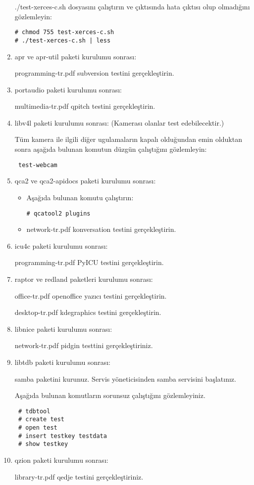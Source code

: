 \documentclass[a4paper,10pt]{article}
\begin{document}
\begin{enumerate}
./test-xerces-c.sh dosyasını çalıştırın ve çıktısında hata çıktısı olup olmadığını gözlemleyin:
\begin{verbatim}
# chmod 755 test-xerces-c.sh
# ./test-xerces-c.sh | less
\end{verbatim}

\item apr ve apr-util paketi kurulumu sonrası:

programming-tr.pdf subversion testini gerçekleştirin.

\item portaudio paketi kurulumu sonrası:

multimedia-tr.pdf qpitch testini gerçekleştirin.

\item libv4l paketi kurulumu sonrası: (Kamerası olanlar test edebilecektir.)

Tüm kamera ile ilgili diğer ugulamaların kapalı olduğundan emin olduktan sonra aşağıda bulunan komutun düzgün çalıştığını gözlemleyin:
\begin{verbatim}
 test-webcam
\end{verbatim}

\item qca2 ve qca2-apidocs paketi kurulumu sonrası:
\begin{itemize}
 \item Aşağıda bulunan komutu çalıştırın:
\begin{verbatim}
# qcatool2 plugins 
\end{verbatim}
\item network-tr.pdf konversation testini gerçekleştirin.
\end{itemize}


\item icu4c paketi kurulumu sonrası:

programming-tr.pdf PyICU testini gerçekleştirin.

\item raptor ve redland paketleri kurulumu sonrası:

office-tr.pdf openoffice yazıcı testini gerçekleştirin.

desktop-tr.pdf kdegraphics testini gerçekleştirin.

\item libnice paketi kurulumu sonrası:

network-tr.pdf pidgin testtini gerçekleştiriniz.

\item libtdb paketi kurulumu sonrası:

samba paketini kurunuz. Servis yöneticisinden samba servisini başlatınız.

Aşağıda bulunan komutların sorunsuz çalıştığını gözlemleyiniz.
\begin{verbatim}
 # tdbtool
 # create test
 # open test 
 # insert testkey testdata
 # show testkey
\end{verbatim}
\item qzion paketi kurulumu sonrası:

library-tr.pdf qedje testini gerçekleştiriniz.

\end{enumerate}
\end{document}
